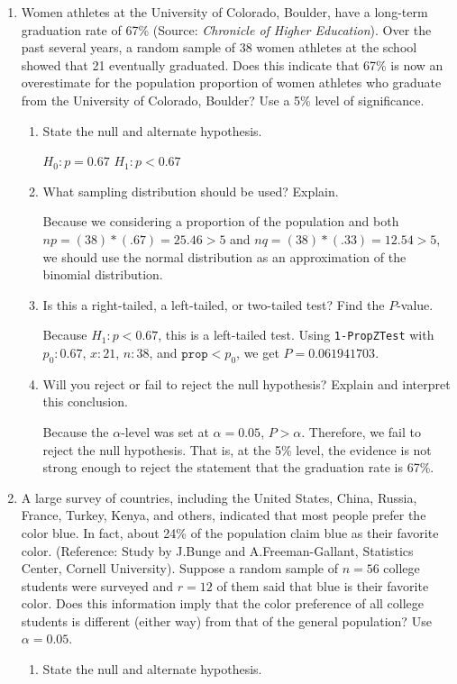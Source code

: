 \begin{enumerate}

\item Women athletes at the University of Colorado, Boulder, have a long-term graduation rate of 67\% (Source: {\em Chronicle of Higher Education}). Over the past several years, a random sample of 38 women athletes at the school showed that 21 eventually graduated. Does this indicate that 67\% is now an overestimate for the population proportion of women athletes who graduate from the University of Colorado, Boulder? Use a 5\% level of significance.
	\begin{enumerate}
	\item State the null and alternate hypothesis. 
	
	{\answer $H_0 : p = 0.67$ 
	$H_1: p < 0.67$} 
		
	\item What sampling distribution should be used? Explain. 
	
	{\answer Because we considering a proportion of the population and both $np = (38)*(.67) = 25.46 >5$ and $nq = (38)*(.33) = 12.54 >5$, we should use the normal distribution as an approximation of the binomial distribution.} 
	
	\item Is this a right-tailed, a left-tailed, or two-tailed test? Find the $P$-value. 
	
	{\answer Because $H_1: p < 0.67$, this is a left-tailed test. 
	Using \texttt{1-PropZTest} with $p_0: 0.67$, $x: 21$, $n:38$, and $\texttt{prop} < p_0$, we get $P = 0.061941703$.} 
	 
	\item Will you reject or fail to reject the null hypothesis? Explain and interpret this conclusion. 
	
	{\answer Because the $\alpha$-level was set at $\alpha = 0.05$, $P > \alpha$. Therefore, we fail to reject the null hypothesis. That is, at the 5\% level, the evidence is not strong enough to reject the statement that the graduation rate is 67\%.} 
	\end{enumerate}

\item A large survey of countries, including the United States, China, Russia, France, Turkey, Kenya, and others, indicated that most people prefer the color blue. In fact, about 24\% of the population claim blue as their favorite color. (Reference: Study by J.Bunge and A.Freeman-Gallant, Statistics Center, Cornell University).  
Suppose a random sample of $n=56$ college students were surveyed and $r=12$ of them said that blue is their favorite color. Does this information imply that the color preference of all college students is different (either way) from that of the general population? Use $\alpha = 0.05$.
	\begin{enumerate}
	\item State the null and alternate hypothesis. 
	

\end{enumerate}
\end{enumerate}
